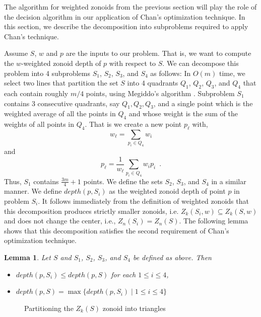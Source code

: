\documentclass[charterfonts,lotsofwhite]{patmorin}
\newtheorem{lemma}{Lemma}
\begin{document}
The algorithm for weighted zonoids from the previous section will play
the role of the decision algorithm in our application of Chan's
optimization technique.  In this section, we describe the
decomposition into subproblems required to apply Chan's technique.

Assume $S$, $w$ and $p$ are the inputs to our problem.  That is, we
want to compute the $w$-weighted zonoid depth of $p$ with respect to
$S$.   We can decompose this problem into 4 subproblems $S_1$, $S_2$,
$S_3$, and $S_4$ as follows: In $O(m)$ time, we select two lines that partition the
set $S$ into 4 quadrants $Q_1$, $Q_2$, $Q_3$, and $Q_4$ that
each contain roughly $m/4$ points, using Megiddo's 
algorithm \cite{partitioning_with_two_lines_in_the_plane}. Subproblem
$S_1$ contains 3 consecutive quadrants, say $Q_1, Q_2, Q_3$, and a
single point which is the weighted average of all the points in
$Q_4$ and whose weight is the sum of the weights of all points in
$Q_4$.  That is we create a new point $p_\ell$ with, 
\[
     w_\ell = \sum_{p_i\in Q_4} w_i
\]
and
\[
     p_\ell = \frac{1}{w_\ell}\sum_{p_i\in Q_4} w_ip_i \enspace .
\]
Thus, $S_1$ contains $\frac{3m}{4}+1$ points. We define the sets
$S_2$, $S_3$, and $S_4$ in a similar manner.  We define $depth(p,S_i)$
as the weighted zonoid depth of point $p$ in problem $S_i$. It follows
immediately from the definition of weighted zonoids that 
this decomposition produces strictly smaller zonoids, i.e.
$Z_k(S_i,w) \subseteq Z_k(S,w)$ and does not change the center, i.e.,
$Z_n(S_i)=Z_n(S)$.  The following lemma shows that this
decomposition satisfies the second requirement of Chan's optimization
technique.

\begin{lemma}\label{lemma_final} Let $S$ and $S_1$, $S_2$, $S_3$, and
$S_4$ be defined as above.  Then
\begin{itemize} \item[a.]
$depth(p,S_i) \le depth(p,S)$ for each $1 \le i \le 4$, \item[b.]
$depth(p,S) = \max\{depth(p,S_i) \mid 1 \le i \le 4\}$ \end{itemize}
\end{lemma}

\begin{figure}[h!]
 \begin{center}
   \caption{\label{fig_for_proof}Partitioning the $Z_k(S)$ zonoid into triangles}
 \end{center}
\end{figure}
\end{document}

